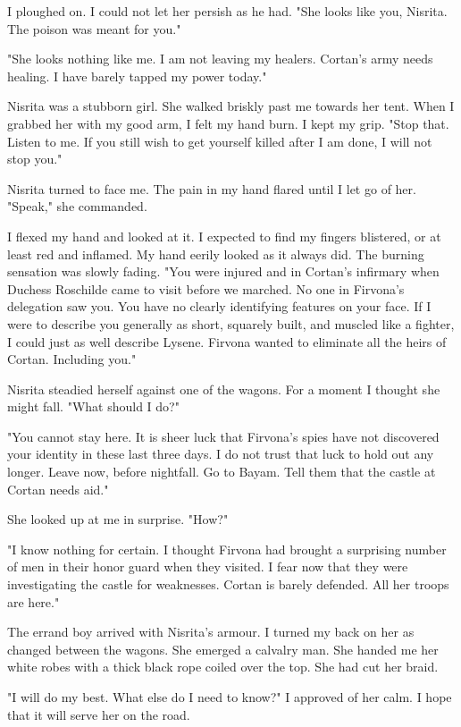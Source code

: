 \documentclass{article}
\begin{document}
I ploughed on. I could not let her persish as he had. "She looks like you, Nisrita. The poison was meant for you."

"She looks nothing like me. I am not leaving my healers. Cortan's army needs healing. I have barely tapped my power today." 

Nisrita was a stubborn girl. She walked briskly past me towards her tent. When I grabbed her with my good arm, I felt my hand burn. I kept my grip. "Stop that. Listen to me. If you still wish to get yourself killed after I am done, I will not stop you."

Nisrita turned to face me. The pain in my hand flared until I let go of her. "Speak," she commanded.

I flexed my hand and looked at it. I expected to find my fingers blistered, or at least red and inflamed. My hand eerily looked as it always did. The burning sensation was slowly fading. "You were injured and in Cortan's infirmary when Duchess Roschilde came to visit before we marched. No one in Firvona's delegation saw you. You have no clearly identifying features on your face. If I were to describe you generally as short, squarely built, and muscled like a fighter, I could just as well describe Lysene. Firvona wanted to eliminate all the heirs of Cortan. Including you."

Nisrita steadied herself against one of the wagons. For a moment I thought she might fall. "What should I do?"

"You cannot stay here. It is sheer luck that Firvona's spies have not discovered your identity in these last three days. I do not trust that luck to hold out any longer. Leave now, before nightfall. Go to Bayam. Tell them that the castle at Cortan needs aid." 

She looked up at me in surprise. "How?"

"I know nothing for certain. I thought Firvona had brought a surprising number of men in their honor guard when they visited. I fear now that they were investigating the castle for weaknesses. Cortan is barely defended. All her troops are here."

The errand boy arrived with Nisrita's armour. I turned my back on her as changed between the wagons. She emerged a calvalry man. She handed me her white robes with a thick black rope coiled over the top. She had cut her braid.

"I will do my best. What else do I need to know?" I approved of her calm. I hope that it will serve her on the road.
\end{document}
